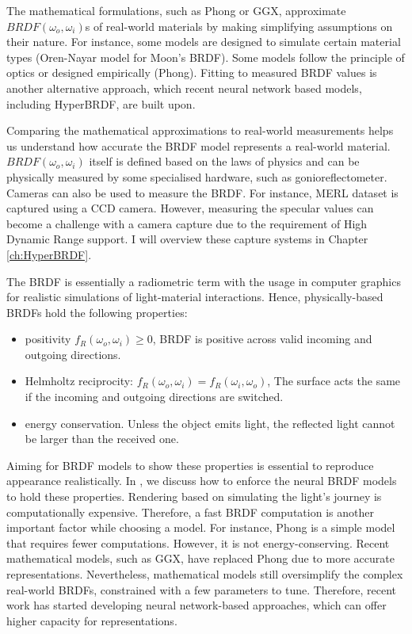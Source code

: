 The mathematical formulations, such as Phong or GGX, approximate $BRDF(\omega_o, \omega_i)$s of real-world materials by making simplifying assumptions on their nature. For instance, some models are designed to simulate certain material types (Oren-Nayar model for Moon's BRDF). Some models follow the principle of optics or designed empirically (Phong). Fitting to measured BRDF values is another alternative approach, which recent neural network based models, including HyperBRDF, are built upon.  

Comparing the mathematical approximations to real-world measurements helps us understand how accurate the BRDF model represents a real-world material. $BRDF(\omega_o, \omega_i)$ itself is defined based on the laws of physics and can be physically measured by some specialised hardware, such as gonioreflectometer. Cameras can also be used to measure the BRDF. For instance, MERL dataset \cite{Matusik2003jul} is captured using a CCD camera. However, measuring the specular values can become a challenge with a camera capture due to the requirement of High Dynamic Range support. I will overview these capture systems in Chapter \ref{ch:HyperBRDF}.

The BRDF is essentially a radiometric term with the usage in computer graphics for realistic simulations of light-material interactions. Hence, physically-based BRDFs hold the following properties:
\begin{itemize}
  \item positivity $f_R(\omega_o, \omega_i) \geq 0$, BRDF is positive across valid incoming and outgoing directions.
  \item Helmholtz reciprocity: $f_R(\omega_o, \omega_i) = f_R(\omega_i, \omega_o)$, The surface acts the same if the incoming and outgoing directions are switched.
  \item energy conservation. Unless the object emits light, the reflected light cannot be larger than the received one.
\end{itemize}


Aiming for BRDF models to show these properties is essential to reproduce appearance realistically. In \citeauthor{Chenliang's paper} \cite{Chenliang's paper}, we discuss how to enforce the neural BRDF models to hold these properties. Rendering based on simulating the light's journey is computationally expensive. Therefore, a fast BRDF computation is another important factor while choosing a model. For instance, Phong is a simple model that requires fewer computations. However, it is not energy-conserving. Recent mathematical models, such as GGX, have replaced Phong due to more accurate representations. Nevertheless, mathematical models still oversimplify the complex real-world BRDFs, constrained with a few parameters to tune. Therefore, recent work has started developing neural network-based approaches, which can offer higher capacity for representations.

